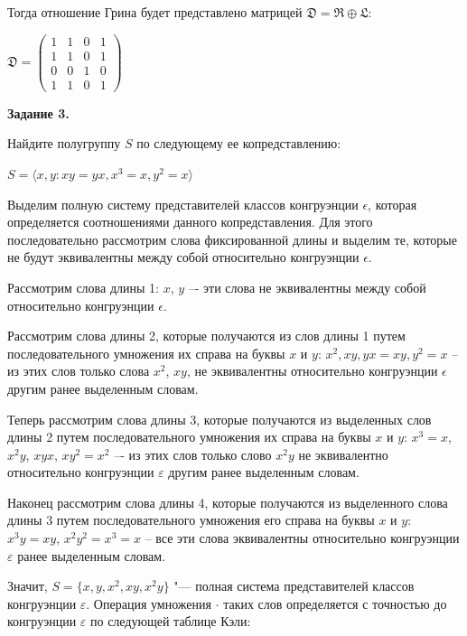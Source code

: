 \documentclass[bachelor, och, labwork]{shiza}
\begin{document}
    Тогда отношение Грина будет представлено матрицей $\mathfrak{D} = \mathfrak{R} \oplus \mathfrak{L}$:

    \begin{center}
      $\mathfrak{D} =
      \begin{pmatrix}
        1 & 1 & 0 & 1 \\
        1 & 1 & 0 & 1 \\
        0 & 0 & 1 & 0 \\
        1 & 1 & 0 & 1
      \end{pmatrix}$
    \end{center}

    \textbf{Задание 3.}
    
    Найдите полугруппу $S$ по следующему ее копредставлению:
    \begin{center}

      $S = \langle x,y : xy = yx, x^3 = x, y^2 = x \rangle$
    \end{center}

    Выделим полную систему представителей классов конгруэнции $\epsilon$, которая определяется соотношениями данного
    копредставления. Для этого последовательно рассмотрим слова фиксированной длины и
    выделим те, которые не будут эквивалентны между собой относительно конгруэнции $\epsilon$.

    Рассмотрим слова длины 1: $x$, $y$ –- эти слова не эквивалентны между собой относительно конгруэнции $\epsilon$.

    Рассмотрим слова длины 2, которые получаются из слов
    длины 1 путем последовательного умножения их справа на буквы $x$ и $y$: $x^2, xy, yx = xy, y^2 = x$ -- из этих 
    слов только слова $x^2$, $xy$, не эквивалентны относительно конгруэнции $\epsilon$ другим ранее выделенным словам.

    Теперь рассмотрим слова длины 3, которые получаются из выделенных слов длины 2 путем последовательного
    умножения их справа на буквы $x$ и $y$: $x^3 = x$, $x^2y$, $xyx$,  $xy^2 = x^2$  –- из этих слов только
    слово $x^2y$ не эквивалентно относительно конгруэнции $\varepsilon$ другим ранее выделенным словам.

    Наконец рассмотрим слова длины 4, которые получаются из выделенного слова длины 3 путем последовательного
    умножения его справа на буквы $x$ и $y$: $x^3y = xy$, $x^2y^2 = x^3 = x$ -- все эти слова эквивалентны
    относительно конгруэнции $\varepsilon$ ранее выделенным словам.

        Значит, $S = \{x, y, x^2, xy, x^2y \}$ "--- полная система представителей классов конгруэнции $\varepsilon$.
        Операция умножения $\cdot$ таких слов определяется с точностью до конгруэнции $\varepsilon$ по следующей таблице
        Кэли:
\end{document}
